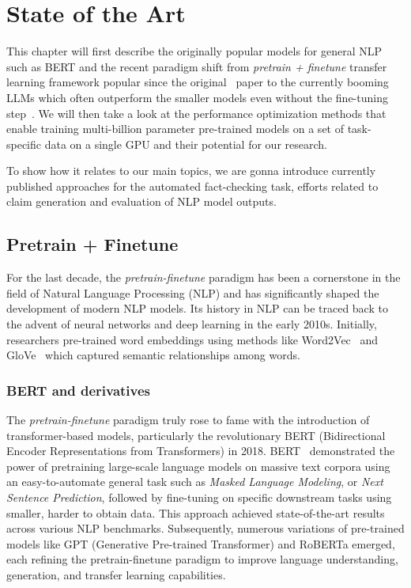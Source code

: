 
\chapter{State of the Art}

This chapter will first describe the originally popular models for general NLP such as BERT and the recent paradigm shift from \textit{pretrain + finetune} transfer learning framework popular since the original~\cite{devlin2019bert} paper to the currently booming LLMs which often outperform the smaller models even without the fine-tuning step~\cite{gpt4,llama,vicuna}. We will then take a look at the performance optimization methods that enable training multi-billion parameter pre-trained models on a set of task-specific data on a single GPU and their potential for our research. 

To show how it relates to our main topics, we are gonna introduce currently published approaches for the automated fact-checking task, efforts related to claim generation and evaluation of NLP model outputs.

\label{chap:sota}
\section{Pretrain + Finetune}
\label{sec:pretrain}
For the last decade, the \textit{pretrain-finetune} paradigm has been a cornerstone in the field of Natural Language Processing (NLP) and has significantly shaped the development of modern NLP models. Its history in NLP can be traced back to the advent of neural networks and deep learning in the early 2010s. Initially, researchers pre-trained word embeddings using methods like Word2Vec~\cite{mikolov} and GloVe~\cite{pennington-etal-2014-glove} which captured semantic relationships among words. 

\subsection{BERT and derivatives}
The \textit{pretrain-finetune} paradigm truly rose to fame with the introduction of transformer-based models, particularly the revolutionary BERT (Bidirectional Encoder Representations from Transformers) in 2018. BERT~\cite{devlin2019bert} demonstrated the power of pretraining large-scale language models on massive text corpora using an easy-to-automate general task such as \textit{Masked Language Modeling}, or \textit{Next Sentence Prediction}, followed by fine-tuning on specific downstream tasks using smaller, harder to obtain data. This approach achieved state-of-the-art results across various NLP benchmarks. Subsequently, numerous variations of pre-trained models like GPT (Generative Pre-trained Transformer) and RoBERTa emerged, each refining the pretrain-finetune paradigm to improve language understanding, generation, and transfer learning capabilities. 

